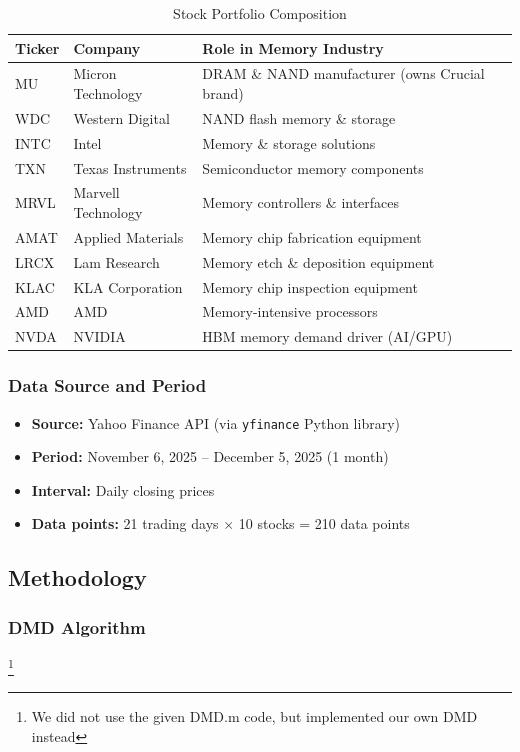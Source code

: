 \documentclass[12pt,a4paper]{article}
\begin{document}
\begin{table}[H]
\centering
\caption{Stock Portfolio Composition}
\label{tab:portfolio}
\begin{tabular}{@{}llp{7cm}@{}}
\toprule
\textbf{Ticker} & \textbf{Company} & \textbf{Role in Memory Industry} \\
\midrule
MU & Micron Technology & DRAM \& NAND manufacturer (owns Crucial brand) \\
WDC & Western Digital & NAND flash memory \& storage \\
INTC & Intel & Memory \& storage solutions \\
TXN & Texas Instruments & Semiconductor memory components \\
MRVL & Marvell Technology & Memory controllers \& interfaces \\
AMAT & Applied Materials & Memory chip fabrication equipment \\
LRCX & Lam Research & Memory etch \& deposition equipment \\
KLAC & KLA Corporation & Memory chip inspection equipment \\
AMD & AMD & Memory-intensive processors \\
NVDA & NVIDIA & HBM memory demand driver (AI/GPU) \\
\bottomrule
\end{tabular}
\end{table}

\subsubsection{Data Source and Period}

\begin{itemize}
    \item \textbf{Source:} Yahoo Finance API (via \texttt{yfinance} Python library)
    \item \textbf{Period:} November 6, 2025 -- December 5, 2025 (1 month)
    \item \textbf{Interval:} Daily closing prices
    \item \textbf{Data points:} 21 trading days $\times$ 10 stocks = 210 data points
\end{itemize}

\subsection{Methodology}

\subsubsection{DMD Algorithm}\footnote{We did not use the given DMD.m code, but implemented our own DMD instead}
\end{document}
